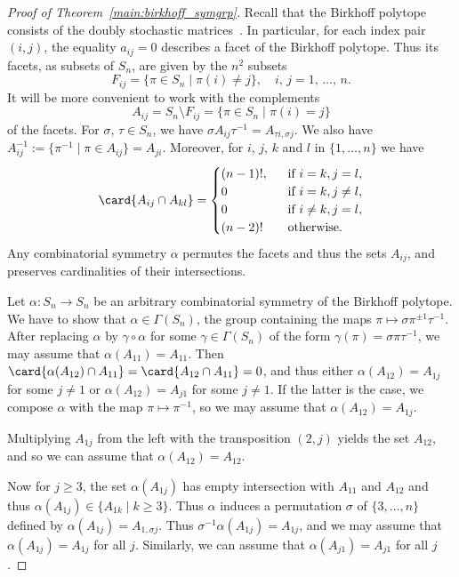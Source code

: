\begin{proof}[Proof of Theorem~\ref{main:birkhoff_symgrp}]
  Recall that the Birkhoff polytope consists of the doubly
  stochastic matrices~\cite[Corollary~1.4.14]{LovaszPlummer86}.
  In particular, for each index pair $(i,j)$,
  the equality
  $a_{ij}=0$ describes a facet of the Birkhoff polytope.
  Thus its facets, as subsets of $S_n$, are given by
  the $n^2$ subsets
  \[ F_{ij} = \{\pi\in S_n \mid \pi(i)\neq j \},
     \quad \text{$i$, $j=1$, $\dotsc $, $n$}.
  \]
  It will be more convenient to work with the complements
  \[ A_{ij}= S_n \setminus F_{ij}
           = \{ \pi \in S_n \mid \pi(i)=j \}
  \] 
  of the facets.
  For $\sigma$, $\tau\in S_n$, 
  we have 
  $\sigma A_{ij} \tau^{-1} = A_{\tau i, \sigma j} $.
  We also have 
  $ A_{ij}^{-1} := \{ \pi^{-1} 
                      \mid \pi \in A_{ij}
                   \}
                 = A_{ji}$.
  Moreover, for $i$, $j$, $k$ and $l$ in $\{1,\dotsc,n\}$
  we have
  \[ \card{A_{ij}\cap A_{kl}}
      =
      \begin{cases}
        (n-1)!, & \text{if } i=k, j=l, \\
        0       & \text{if } i=k, j\neq l,\\
        0       & \text{if } i\neq k, j=l, \\
        (n-2)! \quad & \text{otherwise}.
      \end{cases}
  \]  
  Any combinatorial symmetry $\alpha$ permutes the facets and thus
  the sets $A_{ij}$, and preserves cardinalities of their
  intersections.
  
  Let $\alpha\colon S_n \to S_n$ be an arbitrary
  combinatorial symmetry of the Birkhoff polytope.
  We have to show that $\alpha\in \Gamma(S_n)$,
  the group containing the maps
  $\pi \mapsto \sigma \pi^{\pm 1} \tau^{-1}$.
  After replacing $\alpha$ by $\gamma \circ \alpha$
  for some $\gamma\in \Gamma(S_n)$ of the form
  $\gamma(\pi) = \sigma \pi \tau^{-1}$,
  we may  assume that $\alpha(A_{11})= A_{11}$.
  Then $\card{\alpha(A_{12})\cap A_{11}} = \card{A_{12}\cap A_{11}}=0$,
  and thus either $\alpha(A_{12})= A_{1j}$ for some $j\neq 1$
  or $\alpha(A_{12})=A_{j1}$ for some $j\neq 1$.
  If the latter is the case, we compose $\alpha$
  with the map $\pi\mapsto \pi^{-1}$,
  so we may assume that $\alpha(A_{12})=A_{1j}$.
  
  Multiplying $A_{1j}$ from the left with the transposition
  $(2,j)$ yields the set $A_{12}$,
  and so we can assume that $\alpha(A_{12})= A_{12}$.
  
  Now for $j\geq 3$, the set $\alpha(A_{1j})$ has empty intersection
  with $A_{11}$ and $A_{12}$ and thus
  $\alpha(A_{1j}) \in \{ A_{1k}\mid k\geq 3\}$.
  Thus $\alpha$ induces a permutation 
  $\sigma$ of $\{3,\dotsc, n\}$ defined by
  $\alpha(A_{1j})= A_{1,\sigma j}$.
  Thus $\sigma^{-1} \alpha(A_{1j})= A_{1j}$,
  and we may assume that $\alpha(A_{1j})=A_{1j}$
  for all $j$.
  Similarly, we can assume that
  $\alpha(A_{j1})= A_{j1}$ for all $j$.
  

\end{proof}

